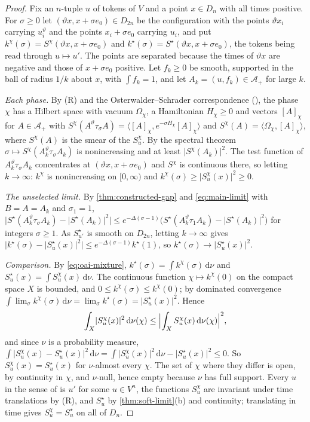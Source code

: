 \documentclass[11pt,a4paper]{amsart}
\theoremstyle{definition}
\theoremstyle{remark}
\numberwithin{equation}{section}
\newcommand{\ip}[2]{\langle #1,#2\rangle}  %
\newcommand{\abs}[1]{\lvert #1\rvert}      %
\newcommand{\dd}{\,\mathrm{d}}             %
\begin{document}
\begin{proof}
Fix an $n$-tuple $u$ of tokens of $V$ and a point $x\in D_n$ with all times positive. For $\sigma\ge0$ let $(\vartheta x,x+\sigma e_0)\in D_{2n}$ be the configuration with the points $\vartheta x_i$ carrying $u_i^\vartheta$ and the points $x_i+\sigma e_0$ carrying $u_i$, and put $k^\chi(\sigma)=S^\chi(\vartheta x,x+\sigma e_0)$ and $k^\star(\sigma)=S^\star(\vartheta x,x+\sigma e_0)$, the tokens being read through $u\mapsto u'$. The points are separated because the times of $\vartheta x$ are negative and those of $x+\sigma e_0$ positive. Let $f_k\ge0$ be smooth, supported in the ball of radius $1/k$ about $x$, with $\int f_k=1$, and let $A_k=(u,f_k)\in\mathcal A_+$ for large $k$.

\emph{Each phase.} By (R) and the Osterwalder--Schrader correspondence \cite{osterwalder1973} (\cite[Lemma~13]{bhattacharjee2026first}), the phase $\chi$ has a Hilbert space with vacuum $\Omega_\chi$, a Hamiltonian $H_\chi\ge0$ and vectors $[A]_\chi$ for $A\in\mathcal A_+$ with $S^\chi(A^\vartheta\tau_\sigma A)=\ip{[A]_\chi}{e^{-\sigma H_\chi}[A]_\chi}$ and $S^\chi(A)=\ip{\Omega_\chi}{[A]_\chi}$, where $S^\chi(A)$ is the smear of the $S^\chi_u$. By the spectral theorem $\sigma\mapsto S^\chi(A_k^\vartheta\tau_\sigma A_k)$ is nonincreasing and at least $\abs{S^\chi(A_k)}^2$. The test function of $A_k^\vartheta\tau_\sigma A_k$ concentrates at $(\vartheta x,x+\sigma e_0)$ and $S^\chi$ is continuous there, so letting $k\to\infty$: $k^\chi$ is nonincreasing on $[0,\infty)$ and $k^\chi(\sigma)\ge\abs{S^\chi_u(x)}^2\ge0$.

\emph{The unselected limit.} By \cref{thm:constructed-gap} and \eqref{eq:main-limit} with $B=A=A_k$ and $\sigma_1=1$, $\abs{S^\star(A_k^\vartheta\tau_\sigma A_k)-\abs{S^\star(A_k)}^2}\le e^{-\Delta(\sigma-1)}\bigl(S^\star(A_k^\vartheta\tau_1A_k)-\abs{S^\star(A_k)}^2\bigr)$ for integers $\sigma\ge1$. As $S^\star_{u'}$ is smooth on $D_{2n}$, letting $k\to\infty$ gives $\abs{k^\star(\sigma)-\abs{S^\star_u(x)}^2}\le e^{-\Delta(\sigma-1)}k^\star(1)$, so $k^\star(\sigma)\to\abs{S^\star_u(x)}^2$.

\emph{Comparison.} By \eqref{eq:oai-mixture}, $k^\star(\sigma)=\int k^\chi(\sigma)\dd\nu$ and $S^\star_u(x)=\int S^\chi_u(x)\dd\nu$. The continuous function $\chi\mapsto k^\chi(0)$ on the compact space $X$ is bounded, and $0\le k^\chi(\sigma)\le k^\chi(0)$; by dominated convergence $\int\lim_\sigma k^\chi(\sigma)\dd\nu=\lim_\sigma k^\star(\sigma)=\abs{S^\star_u(x)}^2$. Hence
\[
\int_X\abs{S^\chi_u(x)}^2\dd\nu(\chi)\le\Bigl\lvert\int_XS^\chi_u(x)\dd\nu(\chi)\Bigr\rvert^2 ,
\]
and since $\nu$ is a probability measure, $\int\abs{S^\chi_u(x)-S^\star_u(x)}^2\dd\nu=\int\abs{S^\chi_u(x)}^2\dd\nu-\abs{S^\star_u(x)}^2\le0$. So $S^\chi_u(x)=S^\star_u(x)$ for $\nu$-almost every $\chi$. The set of $\chi$ where they differ is open, by continuity in $\chi$, and $\nu$-null, hence empty because $\nu$ has full support. Every $u$ in the sense of \cite{openaiym} is $u'$ for some $u\in V^n$, the functions $S^\chi_u$ are invariant under time translations by (R), and $S^\star_u$ by \cref{thm:soft-limit}(b) and continuity; translating in time gives $S^\chi_u=S^\star_u$ on all of $D_n$.


\end{proof}
\end{document}
